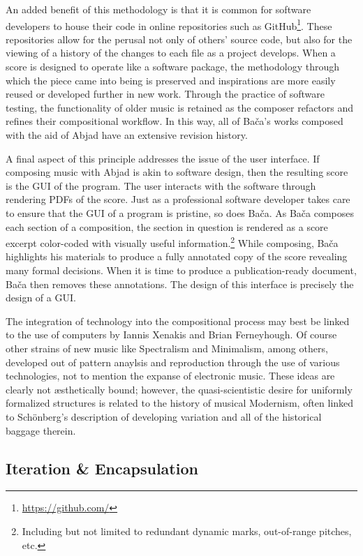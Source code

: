 An added benefit of this methodology is that it is common for software developers to house their code in online repositories such as GitHub\footnote{\url{https://github.com/}}. These repositories allow for the perusal not only of others’ source code, but also for the viewing of a history of the changes to each file as a project develops. When a score is designed to operate like a software package, the methodology through which the piece came into being is preserved and inspirations are more easily reused or developed further in new work. Through the practice of software testing, the functionality of older music is retained as the composer refactors and refines their compositional workflow. In this way, all of Bača's works composed with the aid of Abjad have an extensive revision history.

A final aspect of this principle addresses the issue of the user interface. If composing music with Abjad is akin to software design, then the resulting score is the \ac{GUI} of the program. The user interacts with the software through rendering \acp{PDF} of the score. Just as a professional software developer takes care to ensure that the \ac{GUI} of a program is pristine, so does Bača. As Ba\v{c}a composes each section of a composition, the section in question is rendered as a score excerpt color-coded with visually useful information.\footnote{Including but not limited to redundant dynamic marks, out-of-range pitches, etc.} While composing, Bača highlights his materials to produce a fully annotated copy of the score revealing many formal decisions. When it is time to produce a publication-ready document, Bača then removes these annotations. The design of this interface is precisely the design of a \ac{GUI}.

The integration of technology into the compositional process may best be linked to the use of computers by Iannis Xenakis and Brian Ferneyhough. Of course other strains of new music like Spectralism and Minimalism, among others, developed out of pattern anaylsis and reproduction through the use of various technologies, not to mention the expanse of electronic music. These ideas are clearly not æsthetically bound; however, the quasi-scientistic desire for uniformly formalized structures is related to the history of musical Modernism, often linked to Sch\"{o}nberg's description of developing variation and all of the historical baggage therein.

\subsection{Iteration \& Encapsulation}

